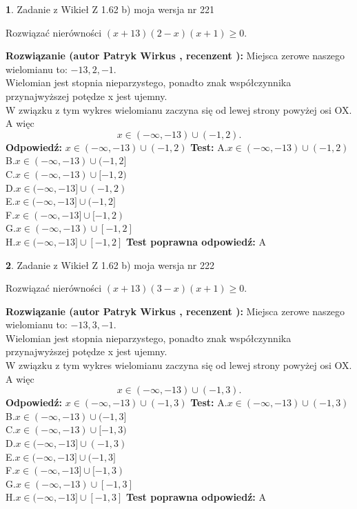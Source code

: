 \documentclass[12pt, a4paper]{article}
\theoremstyle{definition} %
\newtheorem{zad}{}
\newcommand{\zadStart}[1]{\begin{zad}#1\newline}
\newcommand{\zadStop}{\end{zad}}
\newcommand{\rozwStart}[2]{\noindent \textbf{Rozwiązanie (autor #1 , recenzent #2): }\newline}
\newcommand{\rozwStop}{\newline}
\newcommand{\odpStart}{\noindent \textbf{Odpowiedź:}\newline}
\newcommand{\odpStop}{\newline}
\newcommand{\testStart}{\noindent \textbf{Test:}\newline}
\newcommand{\testStop}{\newline}
\newcommand{\kluczStart}{\noindent \textbf{Test poprawna odpowiedź:}\newline}
\newcommand{\kluczStop}{\newline}
\begin{document}
\zadStart{Zadanie z Wikieł Z 1.62 b) moja wersja nr 221}

Rozwiązać nierówności $(x+13)(2-x)(x+1)\ge0$.
\zadStop
\rozwStart{Patryk Wirkus}{}
Miejsca zerowe naszego wielomianu to: $-13, 2, -1$.\\
Wielomian jest stopnia nieparzystego, ponadto znak współczynnika przy\linebreak najwyższej potędze x jest ujemny.\\ W związku z tym wykres wielomianu zaczyna się od lewej strony powyżej osi OX. A więc $$x \in (-\infty,-13) \cup (-1,2).$$
\rozwStop
\odpStart
$x \in (-\infty,-13) \cup (-1,2)$
\odpStop
\testStart
A.$x \in (-\infty,-13) \cup (-1,2)$\\
B.$x \in (-\infty,-13) \cup (-1,2]$\\
C.$x \in (-\infty,-13) \cup [-1,2)$\\
D.$x \in (-\infty,-13] \cup (-1,2)$\\
E.$x \in (-\infty,-13] \cup (-1,2]$\\
F.$x \in (-\infty,-13] \cup [-1,2)$\\
G.$x \in (-\infty,-13) \cup [-1,2]$\\
H.$x \in (-\infty,-13] \cup [-1,2]$
\testStop
\kluczStart
A
\kluczStop



\zadStart{Zadanie z Wikieł Z 1.62 b) moja wersja nr 222}

Rozwiązać nierówności $(x+13)(3-x)(x+1)\ge0$.
\zadStop
\rozwStart{Patryk Wirkus}{}
Miejsca zerowe naszego wielomianu to: $-13, 3, -1$.\\
Wielomian jest stopnia nieparzystego, ponadto znak współczynnika przy\linebreak najwyższej potędze x jest ujemny.\\ W związku z tym wykres wielomianu zaczyna się od lewej strony powyżej osi OX. A więc $$x \in (-\infty,-13) \cup (-1,3).$$
\rozwStop
\odpStart
$x \in (-\infty,-13) \cup (-1,3)$
\odpStop
\testStart
A.$x \in (-\infty,-13) \cup (-1,3)$\\
B.$x \in (-\infty,-13) \cup (-1,3]$\\
C.$x \in (-\infty,-13) \cup [-1,3)$\\
D.$x \in (-\infty,-13] \cup (-1,3)$\\
E.$x \in (-\infty,-13] \cup (-1,3]$\\
F.$x \in (-\infty,-13] \cup [-1,3)$\\
G.$x \in (-\infty,-13) \cup [-1,3]$\\
H.$x \in (-\infty,-13] \cup [-1,3]$
\testStop
\kluczStart
A
\kluczStop
\end{document}
